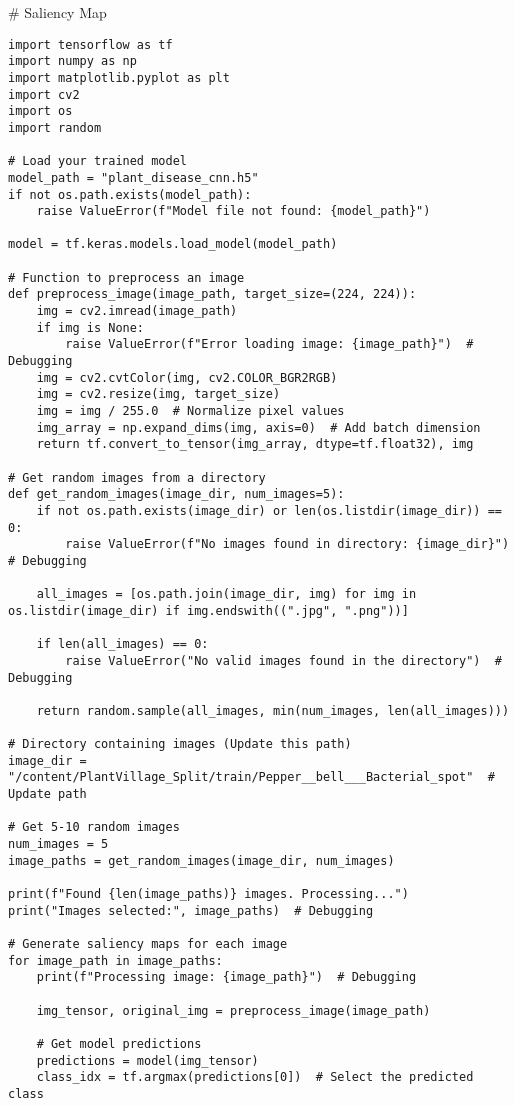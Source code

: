\documentclass{article}
\begin{document}
# Saliency Map
\begin{lstlisting}
import tensorflow as tf
import numpy as np
import matplotlib.pyplot as plt
import cv2
import os
import random

# Load your trained model
model_path = "plant_disease_cnn.h5"
if not os.path.exists(model_path):
    raise ValueError(f"Model file not found: {model_path}")

model = tf.keras.models.load_model(model_path)

# Function to preprocess an image
def preprocess_image(image_path, target_size=(224, 224)):
    img = cv2.imread(image_path)
    if img is None:
        raise ValueError(f"Error loading image: {image_path}")  # Debugging
    img = cv2.cvtColor(img, cv2.COLOR_BGR2RGB)
    img = cv2.resize(img, target_size)
    img = img / 255.0  # Normalize pixel values
    img_array = np.expand_dims(img, axis=0)  # Add batch dimension
    return tf.convert_to_tensor(img_array, dtype=tf.float32), img

# Get random images from a directory
def get_random_images(image_dir, num_images=5):
    if not os.path.exists(image_dir) or len(os.listdir(image_dir)) == 0:
        raise ValueError(f"No images found in directory: {image_dir}")  # Debugging

    all_images = [os.path.join(image_dir, img) for img in os.listdir(image_dir) if img.endswith((".jpg", ".png"))]

    if len(all_images) == 0:
        raise ValueError("No valid images found in the directory")  # Debugging

    return random.sample(all_images, min(num_images, len(all_images)))

# Directory containing images (Update this path)
image_dir = "/content/PlantVillage_Split/train/Pepper__bell___Bacterial_spot"  # Update path

# Get 5-10 random images
num_images = 5
image_paths = get_random_images(image_dir, num_images)

print(f"Found {len(image_paths)} images. Processing...")
print("Images selected:", image_paths)  # Debugging

# Generate saliency maps for each image
for image_path in image_paths:
    print(f"Processing image: {image_path}")  # Debugging

    img_tensor, original_img = preprocess_image(image_path)

    # Get model predictions
    predictions = model(img_tensor)
    class_idx = tf.argmax(predictions[0])  # Select the predicted class


\end{lstlisting}
\end{document}
